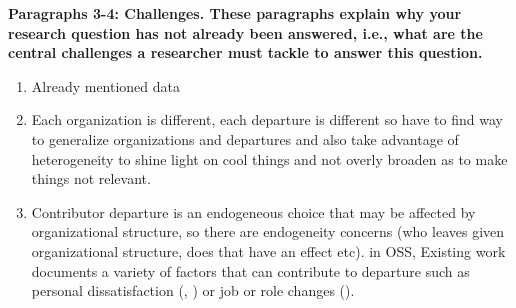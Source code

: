 \documentclass[12pt,notitlepage]{article}
\begin{document}
\textbf{Paragraphs 3-4: Challenges. These paragraphs explain why your research question has not already been answered, i.e., what are the central challenges a researcher must tackle to answer this question.}

\begin{enumerate}
    \item Already mentioned data
    \item Each organization is different, each departure is different so have to find way to generalize organizations and departures and also take advantage of heterogeneity to shine light on cool things and not overly broaden as to make things not relevant. 
    \item Contributor departure is an endogeneous choice that may be affected by organizational structure, so there are endogeneity concerns (who leaves given organizational structure, does that have an effect etc). in OSS, Existing work documents a variety of factors that can contribute to departure such as personal dissatisfaction (\cite{hannon_retaining_2008}, \cite{yu_empirical_2012}) or job or role changes (\cite{miller_why_2019}). 
\end{enumerate}

\end{document}
